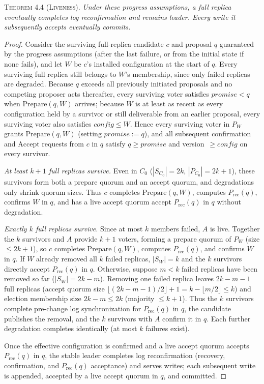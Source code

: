\documentclass[sigconf,nonacm]{acmart}
\begin{document}
\noindent\textsc{Theorem 4.4 (Liveness).}
\emph{Under these progress assumptions, a full replica eventually
completes log reconfirmation and remains leader. Every write it
subsequently accepts eventually commits.}

\begin{proof}
Consider the surviving full-replica candidate \(c\) and proposal \(q\)
guaranteed by the progress assumptions (after the last failure, or from
the initial state if none fails), and let \(W\) be \(c\)'s installed
configuration at the start of \(q\). Every surviving full replica still
belongs to \(W\)'s membership, since only failed replicas are degraded.
Because \(q\) exceeds all previously initiated proposals and no
competing proposer acts thereafter, every surviving voter satisfies
\(\mathit{promise}<q\) when \(\mathrm{Prepare}(q,W)\) arrives; because
\(W\) is at least as recent as every configuration held by a survivor or
still deliverable from an earlier proposal, every surviving voter also
satisfies \(\mathit{config}\le W\). Hence every surviving voter in
\(P_W\) grants \(\mathrm{Prepare}(q,W)\) (setting
\(\mathit{promise}:=q\)), and all subsequent confirmation and
\(\mathrm{Accept}\) requests from \(c\) in \(q\) satisfy
\(q\ge\mathit{promise}\) and version~\(\ge\mathit{config}\) on every
survivor.

\emph{At least \(k+1\) full replicas survive.} Even in \(C_0\)
(\(|S_{C_0}|=2k\), \(|P_{C_0}|=2k+1\)), these survivors form both a
prepare quorum and an accept quorum, and degradations only shrink quorum
sizes. Thus \(c\) completes \(\mathrm{Prepare}(q,W)\), computes
\(P_{\mathrm{rec}}(q)\), confirms \(W\) in \(q\), and has a live
accept quorum accept \(P_{\mathrm{rec}}(q)\) in \(q\) without
degradation.

\emph{Exactly \(k\) full replicas survive.} Since at most \(k\) members
failed, \(A\) is live. Together the \(k\) survivors and \(A\) provide
\(k+1\) voters, forming a prepare quorum of \(P_W\) (size \(\le 2k+1\)),
so \(c\) completes \(\mathrm{Prepare}(q,W)\), computes
\(P_{\mathrm{rec}}(q)\), and confirms \(W\) in \(q\). If \(W\) already removed all \(k\) failed replicas, \(|S_W|=k\) and the
\(k\) survivors directly accept \(P_{\mathrm{rec}}(q)\) in \(q\).
Otherwise, suppose \(m<k\) failed replicas have been removed so far
(\(|S_W|=2k-m\)). Removing one failed replica leaves \(2k-m-1\) full
replicas (accept quorum size
\(\lfloor(2k-m-1)/2\rfloor+1 = k-\lfloor m/2\rfloor \le k\)) and
election membership size \(2k-m\le 2k\) (majority \(\le k+1\)). Thus
the \(k\) survivors complete pre-change log synchronization for
\(P_{\mathrm{rec}}(q)\) in \(q\), the candidate publishes the removal,
and the \(k\) survivors with \(A\) confirm it in \(q\). Each further
degradation completes identically (at most \(k\) failures exist).

Once the effective configuration is confirmed and a live accept quorum
accepts \(P_{\mathrm{rec}}(q)\) in \(q\), the stable leader completes
log reconfirmation (recovery, confirmation, and \(P_{\mathrm{rec}}(q)\)
acceptance) and serves writes; each subsequent write is appended,
accepted by a live accept quorum in \(q\), and committed.
\end{proof}
\end{document}
